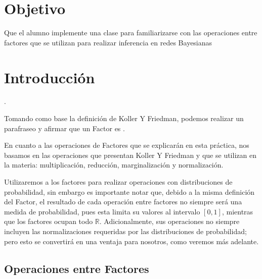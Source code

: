 \section{Objetivo}
Que el alumno implemente una clase  para familiarizarse con las operaciones entre factores que se utilizan para realizar inferencia en redes Bayesianas

\section{Introducción}

\begin{definition}[Factor]
 
 \parencite[104]{KollerFriedman2009}.
\end{definition}

Tomando como base la definición de Koller Y Friedman, podemos realizar un parafraseo y afirmar que un Factor es .

En cuanto a las operaciones de Factores que se explicarán en esta práctica, nos basamos en las operaciones que presentan Koller Y Friedman y que se utilizan en la materia: multiplicación, reducción, marginalización y normalización.

Utilizaremos a los factores para realizar operaciones con distribuciones de probabilidad, sin embargo es importante notar que, debido a la misma definición del Factor, el resultado de cada operación entre factores no siempre será una medida de probabilidad, pues esta limita su valores al intervalo $[0,1]$, mientras que los factores ocupan todo \(\mathbb{R}\).  Adicionalmente, sus operaciones no siempre incluyen las normalizaciones requeridas por las distribuciones de probabilidad; pero esto se convertirá en una ventaja para nosotros, como veremos más adelante.

\subsection[Operaciones]{Operaciones entre Factores}

